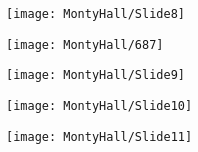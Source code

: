 \documentclass{beamer}
\begin{document}
\begin{frame}
	\begin{figure}

		\texttt{[image: MontyHall/Slide8]}
		
	\end{figure}
	
\end{frame}

\begin{frame}
	\begin{figure}
		\centering
		\texttt{[image: MontyHall/687]}
	\end{figure}
	
\end{frame}
\begin{frame}
	\begin{figure}
		\centering
		\texttt{[image: MontyHall/Slide9]}

	\end{figure}
	
\end{frame}


\begin{frame}
	\begin{figure}
		\centering
		\texttt{[image: MontyHall/Slide10]}
		
	\end{figure}
	
\end{frame}

\begin{frame}
	\begin{figure}
		\centering
		\texttt{[image: MontyHall/Slide11]}
		
	\end{figure}
	
\end{frame}
\end{document}
